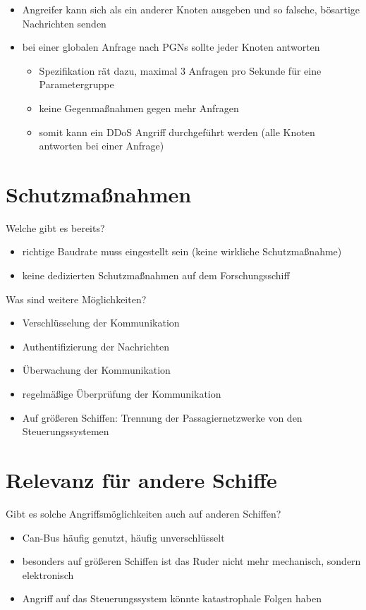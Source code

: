 \begin{itemize}
    \item Angreifer kann sich als ein anderer Knoten ausgeben und so falsche, bösartige Nachrichten senden
    \item bei einer globalen Anfrage nach PGNs sollte jeder Knoten antworten
    \begin{itemize}
        \item Spezifikation rät dazu, maximal 3 Anfragen pro Sekunde für eine Parametergruppe
        \item keine Gegenmaßnahmen gegen mehr Anfragen
        \item somit kann ein DDoS Angriff durchgeführt werden (alle Knoten antworten bei einer Anfrage)
    \end{itemize}
\end{itemize}

\cite{Murvay2018}

\section{Schutzmaßnahmen}
Welche gibt es bereits?
\begin{itemize}
    \item richtige Baudrate muss eingestellt sein (keine wirkliche Schutzmaßnahme)
    \item keine dedizierten Schutzmaßnahmen auf dem Forschungsschiff
\end{itemize}
Was sind weitere Möglichkeiten?
\begin{itemize}
    \item Verschlüsselung der Kommunikation
    \item Authentifizierung der Nachrichten
    \item Überwachung der Kommunikation
    \item regelmäßige Überprüfung der Kommunikation
    \item Auf größeren Schiffen: Trennung der Passagiernetzwerke von den Steuerungssystemen
\end{itemize}

\section{Relevanz für andere Schiffe}
Gibt es solche Angriffsmöglichkeiten auch auf anderen Schiffen?
\begin{itemize}
    \item Can-Bus häufig genutzt, häufig unverschlüsselt
    \item besonders auf größeren Schiffen ist das Ruder nicht mehr mechanisch, sondern elektronisch
    \item Angriff auf das Steuerungssystem könnte katastrophale Folgen haben
\end{itemize}